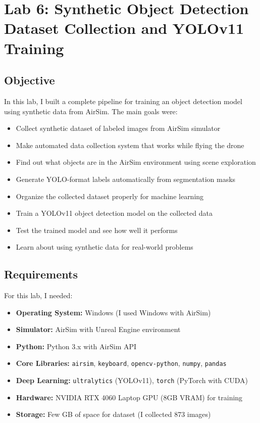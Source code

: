 \section{Lab 6: Synthetic Object Detection Dataset Collection and YOLOv11 Training}

\subsection{Objective}
In this lab, I built a complete pipeline for training an object detection model using synthetic data from AirSim. The main goals were:
\begin{itemize}
	\item Collect synthetic dataset of labeled images from AirSim simulator
	\item Make automated data collection system that works while flying the drone
	\item Find out what objects are in the AirSim environment using scene exploration
	\item Generate YOLO-format labels automatically from segmentation masks
	\item Organize the collected dataset properly for machine learning
	\item Train a YOLOv11 object detection model on the collected data
	\item Test the trained model and see how well it performs
	\item Learn about using synthetic data for real-world problems
\end{itemize}

\subsection{Requirements}
For this lab, I needed:
\begin{itemize}
	\item \textbf{Operating System:} Windows (I used Windows with AirSim)
	\item \textbf{Simulator:} AirSim with Unreal Engine environment
	\item \textbf{Python:} Python 3.x with AirSim API
	\item \textbf{Core Libraries:} \texttt{airsim}, \texttt{keyboard}, \texttt{opencv-python}, \texttt{numpy}, \texttt{pandas}
	\item \textbf{Deep Learning:} \texttt{ultralytics} (YOLOv11), \texttt{torch} (PyTorch with CUDA)
	\item \textbf{Hardware:} NVIDIA RTX 4060 Laptop GPU (8GB VRAM) for training
	\item \textbf{Storage:} Few GB of space for dataset (I collected 873 images)
\end{itemize}

